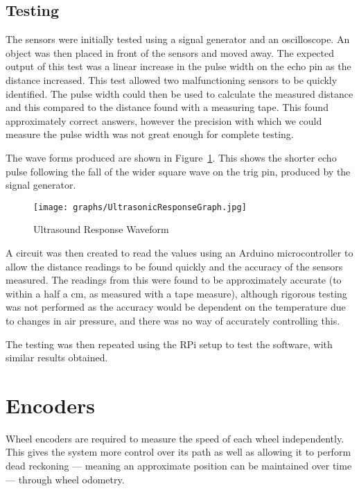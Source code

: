 \subsection{Testing}\label{elec/range/test}
The sensors were initially tested using a signal generator and an
oscilloscope. An object was then placed in front of the sensors
and moved away. The expected output of this test was a linear increase
in the pulse width on the echo pin as the distance
increased. This test allowed two malfunctioning sensors to be quickly identified. The pulse width could then be used to
calculate the measured distance and this compared to the distance
found with a measuring tape. This found approximately correct answers,
however the precision with which we could measure the pulse width was
not great enough for complete testing.

The wave forms produced are shown in Figure~\ref{UltrasoundWaveform}. This shows the shorter echo pulse following the fall of the wider
square wave on the trig pin, produced by the signal generator.

\begin{figure}[!ht]
	\centering
	\texttt{[image: graphs/UltrasonicResponseGraph.jpg]}
	\caption{Ultrasound Response Waveform}\label{UltrasoundWaveform}

\end{figure}

A circuit was then created to read the values using an Arduino
microcontroller to allow the distance readings to be found quickly
and the accuracy of the sensors measured. The readings from this were
found to be approximately accurate (to within a half a \si{\cm},
as measured with a tape measure), although rigorous testing was not
performed as the accuracy would be dependent on the temperature due
to changes in air pressure, and there was no way of accurately controlling this.

The testing was then repeated using the RPi setup to test the
software, with similar results obtained.

\section{Encoders}\label{elec/encoder}
Wheel encoders are required to measure the speed of each wheel
independently. This gives the system more control over its path
as well as allowing it to perform dead reckoning --- meaning an approximate position can be maintained over time --- through wheel odometry.

